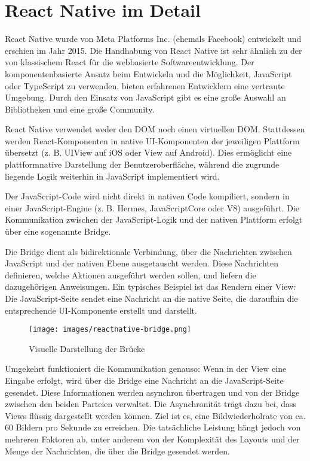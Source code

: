 \section{React Native im Detail}
React Native wurde von Meta Platforms Inc. (ehemals Facebook) entwickelt und erschien im Jahr 2015. Die Handhabung von React Native ist sehr ähnlich zu der von klassischem React für die webbasierte Softwareentwicklung. Der komponentenbasierte Ansatz beim Entwickeln und die Möglichkeit, JavaScript oder TypeScript zu verwenden, bieten erfahrenen Entwicklern eine vertraute Umgebung. Durch den Einsatz von JavaScript gibt es eine große Auswahl an Bibliotheken und eine große Community.

\vspace{0.5cm}

React Native verwendet weder den DOM noch einen virtuellen DOM. Stattdessen werden React-Komponenten in native UI-Komponenten der jeweiligen Plattform übersetzt (z. B. UIView auf iOS oder View auf Android). Dies ermöglicht eine plattformnative Darstellung der Benutzeroberfläche, während die zugrunde liegende Logik weiterhin in JavaScript implementiert wird.

Der JavaScript-Code wird nicht direkt in nativen Code kompiliert, sondern in einer JavaScript-Engine (z. B. Hermes, JavaScriptCore oder V8) ausgeführt. Die Kommunikation zwischen der JavaScript-Logik und der nativen Plattform erfolgt über eine sogenannte Bridge.

\vspace{0.5cm}

Die Bridge dient als bidirektionale Verbindung, über die Nachrichten zwischen JavaScript und der nativen Ebene ausgetauscht werden. Diese Nachrichten definieren, welche Aktionen ausgeführt werden sollen, und liefern die dazugehörigen Anweisungen. Ein typisches Beispiel ist das Rendern einer View: Die JavaScript-Seite sendet eine Nachricht an die native Seite, die daraufhin die entsprechende UI-Komponente erstellt und darstellt.

\vspace{0.5cm}

\begin{figure}[H]
    \centering
    \texttt{[image: images/reactnative-bridge.png]}
    \caption{Visuelle Darstellung der Brücke \cite{ReactNativeBridge}}
\end{figure}

Umgekehrt funktioniert die Kommunikation genauso: Wenn in der View eine Eingabe erfolgt, wird über die Bridge eine Nachricht an die JavaScript-Seite gesendet. Diese Informationen werden asynchron übertragen und von der Bridge zwischen den beiden Parteien verwaltet. Die Asynchronität trägt dazu bei, dass Views flüssig dargestellt werden können. Ziel ist es, eine Bildwiederholrate von ca. 60 Bildern pro Sekunde zu erreichen. Die tatsächliche Leistung hängt jedoch von mehreren Faktoren ab, unter anderem von der Komplexität des Layouts und der Menge der Nachrichten, die über die Bridge gesendet werden.

